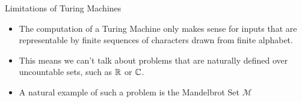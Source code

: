 \documentclass[c]{beamer}
\begin{document}



    
      
      
    

\begin{frame}{Limitations of Turing Machines}

  \begin{itemize}
  \item The computation of a Turing Machine only makes sense for
    inputs that are representable by finite sequences of characters
    drawn from finite alphabet. \pause
  \item This means we can't talk about problems that are naturally
    defined over uncountable sets, such as $\mathbb{R}$ or $\mathbb{C}$.\pause
  \item A natural example of such a problem is the Mandelbrot Set
    $\mathcal{M}$
  \end{itemize}
  
\end{frame}
\end{document}
